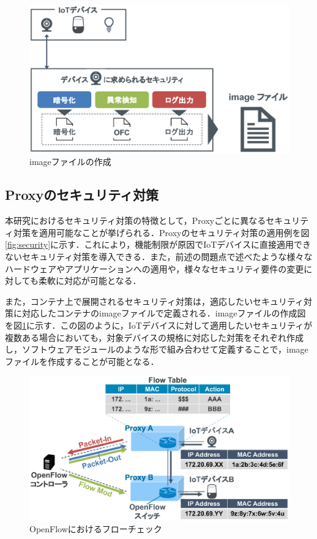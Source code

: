 \documentclass[Japanese]{dicomopapers}
\begin{document}
\begin{figure}[!tb]
	\centering
	\includegraphics[width=\linewidth]{img/dockerimage.eps}
	\caption{imageファイルの作成}
	\label{fig:dockerimage}
\end{figure}

\subsection{Proxyのセキュリティ対策}
本研究におけるセキュリティ対策の特徴として，Proxyごとに異なるセキュリティ対策を適用可能なことが挙げられる．Proxyのセキュリティ対策の適用例を図\ref{fig:security}に示す．これにより，機能制限が原因でIoTデバイスに直接適用できないセキュリティ対策を導入できる．また，前述の問題点で述べたような様々なハードウェアやアプリケーションへの適用や，様々なセキュリティ要件の変更に対しても柔軟に対応が可能となる．\par
また，コンテナ上で展開されるセキュリティ対策は，適応したいセキュリティ対策に対応したコンテナのimageファイルで定義される．imageファイルの作成図を図\ref{fig:dockerimage}に示す．この図のように，IoTデバイスに対して適用したいセキュリティが複数ある場合においても，対象デバイスの規格に対応した対策をそれぞれ作成し，ソフトウェアモジュールのような形で組み合わせて定義することで，imageファイルを作成することが可能となる．

\begin{figure}[!tb]
	\centering
	\includegraphics[width=\linewidth]{img/openflow.eps}
	\caption{OpenFlowにおけるフローチェック}
	\label{fig:openflow}
\end{figure}
\end{document}
